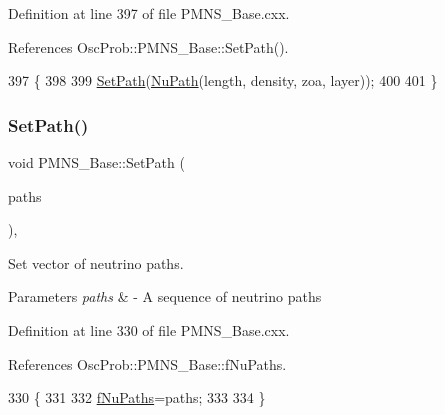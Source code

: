 Definition at line 397 of file P\+M\+N\+S\+\_\+\+Base.\+cxx.



References Osc\+Prob\+::\+P\+M\+N\+S\+\_\+\+Base\+::\+Set\+Path().


\begin{DoxyCode}
397                                                                            \{
398 
399   \hyperlink{classOscProb_1_1PMNS__Base_ac3b644fd0a56347d304ceca4ae9d8875}{SetPath}(\hyperlink{structOscProb_1_1NuPath}{NuPath}(length, density, zoa, layer));
400 
401 \}
\end{DoxyCode}
\mbox{\label{classOscProb_1_1PMNS__Base_a637d19dd850b4246507796526622643c}} 
\subsubsection{\texorpdfstring{Set\+Path()}{SetPath()}\hspace{0.1cm}{\footnotesize\ttfamily [3/3]}}
{\footnotesize\ttfamily void P\+M\+N\+S\+\_\+\+Base\+::\+Set\+Path (\begin{DoxyParamCaption}\item[{std\+::vector$<$ \hyperlink{structOscProb_1_1NuPath}{Osc\+Prob\+::\+Nu\+Path} $>$}]{paths }\end{DoxyParamCaption})\hspace{0.3cm}{\ttfamily [virtual]}, {\ttfamily [inherited]}}

Set vector of neutrino paths. 
\begin{DoxyParams}{Parameters}
{\em paths} & -\/ A sequence of neutrino paths \\
\hline
\end{DoxyParams}


Definition at line 330 of file P\+M\+N\+S\+\_\+\+Base.\+cxx.



References Osc\+Prob\+::\+P\+M\+N\+S\+\_\+\+Base\+::f\+Nu\+Paths.


\begin{DoxyCode}
330                                               \{
331 
332   \hyperlink{classOscProb_1_1PMNS__Base_a69db9d57e12fc7cbe0431bc6c18fac93}{fNuPaths}=paths;
333 
334 \}
\end{DoxyCode}
\mbox{\label{classOscProb_1_1PMNS__Base_a4de96ac9b6d1e9b029ab877e57d211ad}} 
